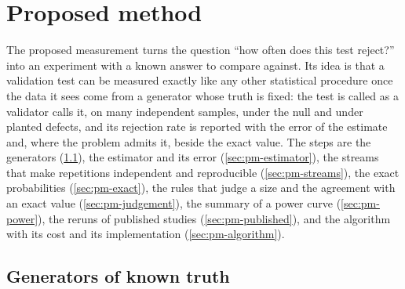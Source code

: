 \section{Proposed method}
\label{sec:proposed-method}

The proposed measurement turns the question ``how often does this test reject?'' into an experiment with a known answer to compare against.
Its idea is that a validation test can be measured exactly like any other statistical procedure once the data it sees come from a generator whose truth is fixed: the test is called as a validator calls it, on many independent samples, under the null and under planted defects, and its rejection rate is reported with the error of the estimate and, where the problem admits it, beside the exact value.
The steps are the generators (\cref{sec:pm-generators}), the estimator and its error (\cref{sec:pm-estimator}), the streams that make repetitions independent and reproducible (\cref{sec:pm-streams}), the exact probabilities (\cref{sec:pm-exact}), the rules that judge a size and the agreement with an exact value (\cref{sec:pm-judgement}), the summary of a power curve (\cref{sec:pm-power}), the reruns of published studies (\cref{sec:pm-published}), and the algorithm with its cost and its implementation (\cref{sec:pm-algorithm}).

\subsection{Generators of known truth}
\label{sec:pm-generators}


